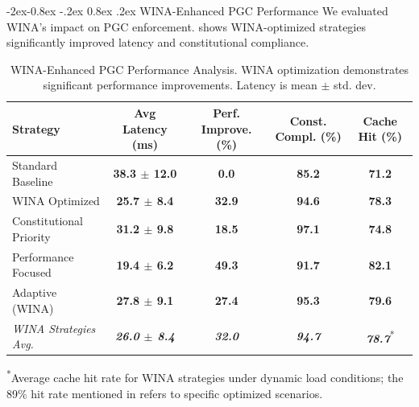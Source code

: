 \documentclass[manuscript,screen,9pt]{acmart}
\makeatletter
\renewcommand\subsubsection{\@startsection{subsubsection}{3}{\z@}%
  {-2ex\@plus -0.8ex \@minus -.2ex}%
  {0.8ex \@plus .2ex}%
  {\normalfont\normalsize\bfseries}}
\newcommand{\tablesize}{\footnotesize}
\newcommand{\tablenumfmt}[1]{\textbf{#1}}
\newcommand{\tableheader}[1]{\textbf{#1}}
\makeatother
\begin{document}
\subsubsection{WINA-Enhanced PGC Performance}
\label{subsubsec:wina_performance_evaluation}
We evaluated WINA's impact on PGC enforcement.  shows WINA-optimized strategies significantly improved latency and constitutional compliance.
\begin{table}[htbp]
\centering
\caption{WINA-Enhanced PGC Performance Analysis. WINA optimization demonstrates significant performance improvements. Latency is mean $\pm$ std. dev.}
\label{tab:wina_pgc_performance}
\tablesize
\begin{tabular}{@{}lcccc@{}}
\toprule
\tableheader{Strategy} & \tableheader{Avg Latency (ms)} & \tableheader{Perf. Improve. (\%)} & \tableheader{Const. Compl. (\%)} & \tableheader{Cache Hit (\%)} \\
\midrule
Standard Baseline     & \tablenumfmt{38.3 $\pm$ 12.0} & \tablenumfmt{0.0}    & \tablenumfmt{85.2} & \tablenumfmt{71.2} \\
WINA Optimized        & \tablenumfmt{25.7 $\pm$ 8.4}  & \tablenumfmt{32.9}   & \tablenumfmt{94.6} & \tablenumfmt{78.3} \\
Constitutional Priority & \tablenumfmt{31.2 $\pm$ 9.8}  & \tablenumfmt{18.5}   & \tablenumfmt{97.1} & \tablenumfmt{74.8} \\
Performance Focused   & \tablenumfmt{19.4 $\pm$ 6.2}  & \tablenumfmt{49.3}   & \tablenumfmt{91.7} & \tablenumfmt{82.1} \\
Adaptive (WINA)       & \tablenumfmt{27.8 $\pm$ 9.1}  & \tablenumfmt{27.4}   & \tablenumfmt{95.3} & \tablenumfmt{79.6} \\
\midrule
\textit{WINA Strategies Avg.} & \textit{\tablenumfmt{26.0 $\pm$ 8.4}} & \textit{\tablenumfmt{32.0}} & \textit{\tablenumfmt{94.7}} & \textit{\tablenumfmt{78.7}}\textsuperscript{*} \\
\bottomrule
\end{tabular}
\begin{minipage}{\linewidth}\footnotesize \textsuperscript{*}Average cache hit rate for WINA strategies under dynamic load conditions; the 89\% hit rate mentioned in  refers to specific optimized scenarios.\end{minipage}
\end{table}
\end{document}
